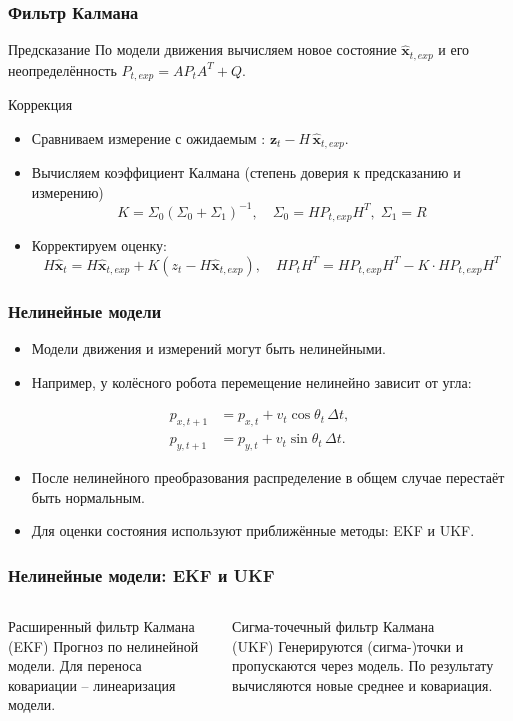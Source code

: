 \documentclass[aspectratio=169]{beamer}
\begin{document}
\begin{frame}
\frametitle{Фильтр Калмана}
\small
\begin{block}{Предсказание}
По модели движения вычисляем новое состояние $\hat{\mathbf x}_{t, exp}$ и его неопределённость $P_{t, exp} = AP_tA^T+Q$.
\end{block}
\begin{block}{Коррекция}
\begin{itemize}
  \item Сравниваем измерение с ожидаемым : $\mathbf z_t-H\,\hat{\mathbf x}_{t,exp}$.
  \item Вычисляем коэффициент Калмана (степень доверия к предсказанию и измерению)
  \[K = \Sigma_0 (\Sigma_0 + \Sigma_1)^{-1}, \quad \Sigma_0 = HP_{t,exp}H^T,\; \Sigma_1 = R\]
  \item Корректируем оценку:
    \[H\hat{\mathbf x}_t = H\hat{\mathbf x}_{t, exp} + K(z_t-H\hat{\mathbf x}_{t,exp}), \quad HP_{t}H^T = HP_{t,exp}H^T - K \cdot HP_{t,exp}H^T\]
\end{itemize}
\end{block}
\end{frame}

\begin{frame}
\frametitle{Нелинейные модели}
\small
\begin{itemize}
  \item Модели движения и измерений могут быть нелинейными.
  \item Например, у колёсного робота перемещение нелинейно зависит от угла:
\end{itemize}
\[
 \begin{aligned}
 p_{x,t+1}&=p_{x,t}+v_t\cos\theta_t\,\Delta t,\\
 p_{y,t+1}&=p_{y,t}+v_t\sin\theta_t\,\Delta t.
 \end{aligned}
\]
\begin{itemize}
  \item После нелинейного преобразования распределение в общем случае перестаёт быть нормальным.
  \item Для оценки состояния используют приближённые методы: EKF и UKF.
\end{itemize}
\end{frame}

\begin{frame}
\frametitle{Нелинейные модели: EKF и UKF}
\small
\begin{columns}[T]
\begin{block}{Расширенный фильтр Калмана\\(EKF)}
Прогноз по нелинейной модели. Для переноса ковариации -- линеаризация модели.
\end{block}
\begin{block}{Сигма-точечный фильтр Калмана\\(UKF)}
Генерируются (сигма-)точки и пропускаются через модель. По результату вычисляются новые среднее и ковариация.
\end{block}
\end{columns}
\end{frame}
\end{document}
